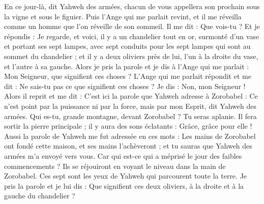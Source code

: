 \begin{multicols}{2}
En ce jour-là, dit Yahweh des armées, chacun de vous appellera son prochain sous la vigne et sous le figuier.
\VerseOne{}Puis l'Ange qui me parlait revint, et il me réveilla comme un homme que l'on réveille de son sommeil.
Il me dit : Que vois-tu ? Et je répondis : Je regarde, et voici, il y a un chandelier tout en or, surmonté d'un vase et portant ses sept lampes, avec sept conduits pour les sept lampes qui sont au sommet du chandelier ;
et il y a deux oliviers près de lui, l'un à la droite du vase, et l'autre à sa gauche.
Alors je pris la parole et je dis à l'Ange qui me parlait : Mon Seigneur, que signifient ces choses ?
L'Ange qui me parlait répondit et me dit : Ne sais-tu pas ce que signifient ces choses ? Je dis : Non, mon Seigneur !
Alors il reprit et me dit : C'est ici la parole que Yahweh adresse à Zorobabel : Ce n'est point par la puissance ni par la force, mais par mon Esprit, dit Yahweh des armées.
Qui es-tu, grande montagne, devant Zorobabel ? Tu seras aplanie. Il fera sortir la pierre principale ; il y aura des sons éclatants : Grâce, grâce pour elle !
Aussi la parole de Yahweh me fut adressée en ces mots :
Les mains de Zorobabel ont fondé cette maison, et ses mains l'achèveront ; et tu sauras que Yahweh des armées m'a envoyé vers vous.
Car qui est-ce qui a méprisé le jour des faibles commencements ? Ils se réjouiront en voyant le niveau dans la main de Zorobabel. Ces sept sont les yeux de Yahweh qui parcourent toute la terre.
Je pris la parole et je lui dis : Que signifient ces deux oliviers, à la droite et à la gauche du chandelier ?

\end{multicols}

